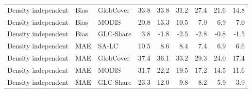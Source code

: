 \begin{longtable}{lllrrrrrr}
  Density independent & Bias & GlobCover & 33.8 & 33.8 & 31.2 & 27.4 & 21.6 & 14.8 \\ 
  Density independent & Bias & MODIS & 20.8 & 13.3 & 10.5 & 7.0 & 6.9 & 7.0 \\ 
  Density independent & Bias & GLC-Share & 3.8 & -1.8 & -2.5 & -2.8 & -0.8 & -1.5 \\ 
  Density independent & MAE & SA-LC & 10.5 & 8.6 & 8.4 & 7.4 & 6.9 & 6.6 \\ 
  Density independent & MAE & GlobCover & 37.4 & 36.1 & 33.2 & 29.3 & 24.0 & 17.4 \\ 
  Density independent & MAE & MODIS & 31.7 & 22.2 & 19.5 & 17.2 & 14.5 & 11.6 \\ 
  Density independent & MAE & GLC-Share & 23.3 & 12.0 & 9.8 & 8.2 & 5.9 & 3.9 \\ 
   \hline
\hline
\end{longtable}
